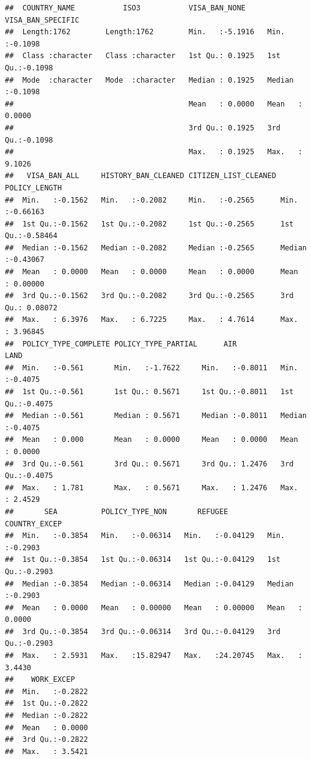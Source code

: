 \documentclass[]{article}
\begin{document}
\begin{verbatim}
##  COUNTRY_NAME           ISO3           VISA_BAN_NONE     VISA_BAN_SPECIFIC
##  Length:1762        Length:1762        Min.   :-5.1916   Min.   :-0.1098  
##  Class :character   Class :character   1st Qu.: 0.1925   1st Qu.:-0.1098  
##  Mode  :character   Mode  :character   Median : 0.1925   Median :-0.1098  
##                                        Mean   : 0.0000   Mean   : 0.0000  
##                                        3rd Qu.: 0.1925   3rd Qu.:-0.1098  
##                                        Max.   : 0.1925   Max.   : 9.1026  
##   VISA_BAN_ALL     HISTORY_BAN_CLEANED CITIZEN_LIST_CLEANED POLICY_LENGTH     
##  Min.   :-0.1562   Min.   :-0.2082     Min.   :-0.2565      Min.   :-0.66163  
##  1st Qu.:-0.1562   1st Qu.:-0.2082     1st Qu.:-0.2565      1st Qu.:-0.58464  
##  Median :-0.1562   Median :-0.2082     Median :-0.2565      Median :-0.43067  
##  Mean   : 0.0000   Mean   : 0.0000     Mean   : 0.0000      Mean   : 0.00000  
##  3rd Qu.:-0.1562   3rd Qu.:-0.2082     3rd Qu.:-0.2565      3rd Qu.: 0.08072  
##  Max.   : 6.3976   Max.   : 6.7225     Max.   : 4.7614      Max.   : 3.96845  
##  POLICY_TYPE_COMPLETE POLICY_TYPE_PARTIAL      AIR               LAND        
##  Min.   :-0.561       Min.   :-1.7622     Min.   :-0.8011   Min.   :-0.4075  
##  1st Qu.:-0.561       1st Qu.: 0.5671     1st Qu.:-0.8011   1st Qu.:-0.4075  
##  Median :-0.561       Median : 0.5671     Median :-0.8011   Median :-0.4075  
##  Mean   : 0.000       Mean   : 0.0000     Mean   : 0.0000   Mean   : 0.0000  
##  3rd Qu.:-0.561       3rd Qu.: 0.5671     3rd Qu.: 1.2476   3rd Qu.:-0.4075  
##  Max.   : 1.781       Max.   : 0.5671     Max.   : 1.2476   Max.   : 2.4529  
##       SEA          POLICY_TYPE_NON       REFUGEE         COUNTRY_EXCEP    
##  Min.   :-0.3854   Min.   :-0.06314   Min.   :-0.04129   Min.   :-0.2903  
##  1st Qu.:-0.3854   1st Qu.:-0.06314   1st Qu.:-0.04129   1st Qu.:-0.2903  
##  Median :-0.3854   Median :-0.06314   Median :-0.04129   Median :-0.2903  
##  Mean   : 0.0000   Mean   : 0.00000   Mean   : 0.00000   Mean   : 0.0000  
##  3rd Qu.:-0.3854   3rd Qu.:-0.06314   3rd Qu.:-0.04129   3rd Qu.:-0.2903  
##  Max.   : 2.5931   Max.   :15.82947   Max.   :24.20745   Max.   : 3.4430  
##    WORK_EXCEP     
##  Min.   :-0.2822  
##  1st Qu.:-0.2822  
##  Median :-0.2822  
##  Mean   : 0.0000  
##  3rd Qu.:-0.2822  
##  Max.   : 3.5421
\end{verbatim}
\end{document}
